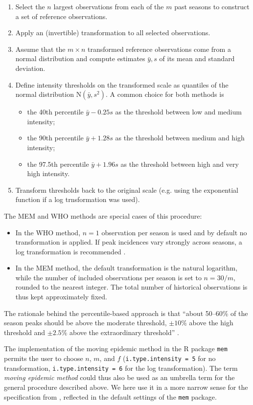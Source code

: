 \documentclass{article}
\newcommand{\sd}{s}
\newcommand{\mean}{\bar{y}}
\begin{document}
\begin{enumerate}
\item Select the $n$ largest observations from each of the $m$ past seasons to construct a set of reference observations.
\item Apply an (invertible) transformation to all selected observations.
\item Assume that the $m \times n$ transformed reference observations come from a normal distribution and compute estimates $\mean, \sd$ of its mean and standard deviation.
\item Define intensity thresholds on the transformed scale as quantiles of the normal distribution N$(\mean, \sd^2)$. A common choice for both methods is
\begin{itemize}
\item the 40th percentile $\mean - 0.25 \sd$ as the threshold between low and medium intensity;
\item the 90th percentile $\mean + 1.28 \sd$ as the threshold between medium and high intensity;
\item the 97.5th percentile $\mean + 1.96\sd$ as the threshold between high and very high intensity.
\end{itemize}
\item Transform thresholds back to the original scale (e.g. using the exponential function if a log trnsformation was used).
\end{enumerate}

\noindent The MEM and WHO methods are special cases of this procedure:
\begin{itemize}
\item In the WHO method, $n = 1$ observation per season is used and by default no transformation is applied. If peak incidences vary strongly across seasons, a log transformation is recommended \citep{WHO2017}. 
\item In the MEM method, the default transformation is the natural logarithm, while the number of included observations per season is set to $n = 30/m$, rounded to the nearest integer. The total number of historical observations is thus kept approximately fixed.
\end{itemize}
The rationale behind the percentile-based approach is that ``about 50--60\% of the season peaks should be above the moderate threshold, $\pm 10\%$ above the high threshold and $\pm 2.5\%$ above the extraordinary threshold'' \citep{WHO2017}.

The implementation of the moving epidemic method in the R package \texttt{mem} \citep{Lozano2020} permits the user to choose $n$, $m$, and $f$ (\texttt{i.type.intensity	= 5} for no transformation, \texttt{i.type.intensity = 6} for the log transformation). The term \textit{moving epidemic method} could thus also be used as an umbrella term for the general procedure described above. We here use it in a more narrow sense for the specification from \cite{Vega2015}, reflected in the default settings of the \texttt{mem} package.
\end{document}
